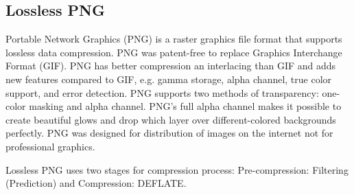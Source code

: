 % 



\subsection{Lossless PNG}

Portable Network Graphics (PNG) is a raster graphics file format that supports lossless data compression. PNG was patent-free to replace Graphics Interchange Format (GIF). PNG has better compression an interlacing than GIF and adds new features compared to GIF, e.g. gamma storage, alpha channel, true color support, and error detection. PNG supports two methods of transparency: one-color masking and alpha channel. PNG's full alpha channel makes it possible to create beautiful glows and drop which layer over different-colored backgrounds perfectly. PNG was designed for distribution of images on the internet not for professional graphics.

Lossless PNG uses two stages for compression process: Pre-compression: Filtering (Prediction) and Compression: DEFLATE.

